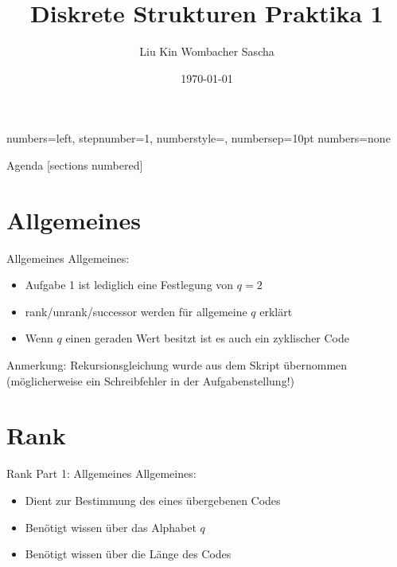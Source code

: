 \documentclass[aspectratio=169]{beamer}
\title{Diskrete Strukturen \newline Praktika 1}
\date{\today}
\author{Liu Kin \newline Wombacher Sascha \newline}
\begin{document}
  {numbers=left, stepnumber=1, numberstyle=\tiny, numbersep=10pt}
  {numbers=none}


  \maketitle
  \begin{frame}{Agenda}
    [sections numbered]
    \tableofcontents[hideallsubsections]
  \end{frame}
  
  
\section{Allgemeines}
    \begin{frame}{Allgemeines}
    Allgemeines:
	\begin{itemize}
		\item Aufgabe 1 ist lediglich eine Festlegung von $q=2$
		\item rank/unrank/successor werden für allgemeine $q$ erklärt
		\item Wenn $q$ einen geraden Wert besitzt ist es auch ein zyklischer Code
  	\end{itemize}
	Anmerkung: \newline
	Rekursionsgleichung wurde aus dem Skript übernommen (möglicherweise ein Schreibfehler in der Aufgabenstellung!)
    \end{frame}
    
\section{Rank}
    \begin{frame}{Rank \newline Part 1: Allgemeines}
    Allgemeines:
    \begin{itemize}
	    \item Dient zur Bestimmung des  eines übergebenen Codes
	    \item Benötigt wissen über das Alphabet $q$
	    \item Benötigt wissen über die Länge des Codes
    \end{itemize}
    \end{frame}
    
\end{document}
